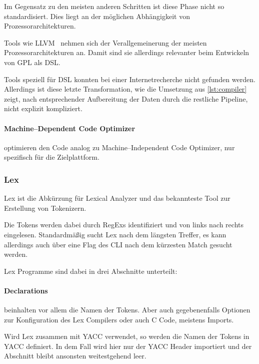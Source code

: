 Im Gegensatz zu den meisten anderen Schritten ist diese Phase nicht so standardisiert.
Dies liegt an der möglichen Abhängigkeit von Prozessorarchitekturen.

Tools wie \ac{LLVM}~\autocite{llvm-project-2024} nehmen sich der Verallgemeinerung der meisten Prozessorarchitekturen an.
Damit sind sie allerdings relevanter beim Entwickeln von \ac{GPL} als \ac{DSL}.

Tools speziell für \ac{DSL} konnten bei einer Internetrecherche nicht gefunden werden.
Allerdings ist diese letzte Transformation, wie die Umsetzung aus \autoref{lst:compiler} zeigt, nach entsprechender Aufbereitung der Daten durch die restliche Pipeline, nicht explizit kompliziert.

\paragraph{Machine--Dependent Code Optimizer} optimieren den Code analog zu Machine--Independent Code Optimizer, nur spezifisch für die Zielplattform.

\subsubsection{Lex}\label{subsubsec:lex}
Lex ist die Abkürzung für Lexical Analyzer und das bekannteste Tool zur Erstellung von Tokenizern.

Die Tokens werden dabei durch \acp{RegEx} identifiziert und von links nach rechts eingelesen.
Standardmäßig sucht Lex nach dem längsten Treffer, es kann allerdings auch über eine Flag des \ac{CLI} nach dem kürzesten Match gesucht werden.

Lex Programme sind dabei in drei Abschnitte unterteilt:


\paragraph{Declarations} beinhalten vor allem die Namen der Tokens.
Aber auch gegebenenfalls Optionen zur Konfiguration des Lex Compilers oder auch C Code, meistens Imports.

Wird Lex zusammen mit \ac{YACC} verwendet, so werden die Namen der Tokens in \ac{YACC} definiert.
In dem Fall wird hier nur der \ac{YACC} Header importiert und der Abschnitt bleibt ansonsten weitestgehend leer.

